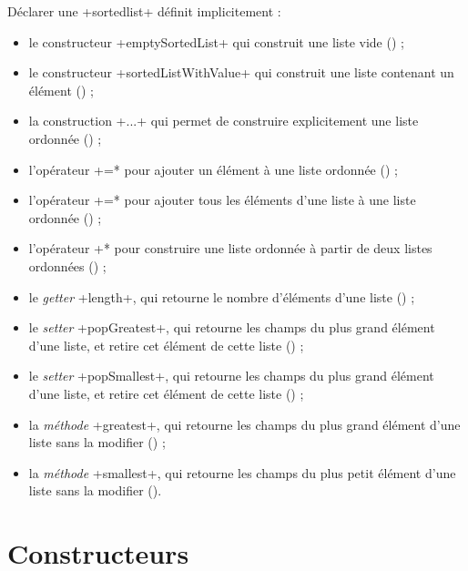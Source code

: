 Déclarer une \ggsq+sortedlist+ définit implicitement :
\begin{itemize}
  \item le constructeur \ggsq+emptySortedList+ qui construit une liste vide () ;
  \item le constructeur \ggsq+sortedListWithValue+ qui construit une liste contenant un élément () ;
  \item la construction \ggsq+{...}+ qui permet de construire explicitement une liste ordonnée () ;
  \item l'opérateur \ggsq*+=* pour ajouter un élément à une liste ordonnée () ;
  \item l'opérateur \ggsq*+=* pour ajouter tous les éléments d'une liste à une liste ordonnée () ;
  \item l'opérateur \ggsq*+* pour construire une liste ordonnée à partir de deux listes ordonnées () ;
  \item le \emph{getter} \ggsq+length+, qui retourne le nombre d'éléments d'une liste () ;
  \item le \emph{setter} \ggsq+popGreatest+, qui retourne les champs du plus grand élément d'une liste, et retire cet élément de cette liste () ;
  \item le \emph{setter} \ggsq+popSmallest+, qui retourne les champs du plus grand élément d'une liste, et retire cet élément de cette liste () ;
  \item la \emph{méthode} \ggsq+greatest+, qui retourne les champs du plus grand élément d'une liste sans la modifier () ;
  \item la \emph{méthode} \ggsq+smallest+, qui retourne les champs du plus petit élément d'une liste sans la modifier ().
\end{itemize}








\section{Constructeurs}

